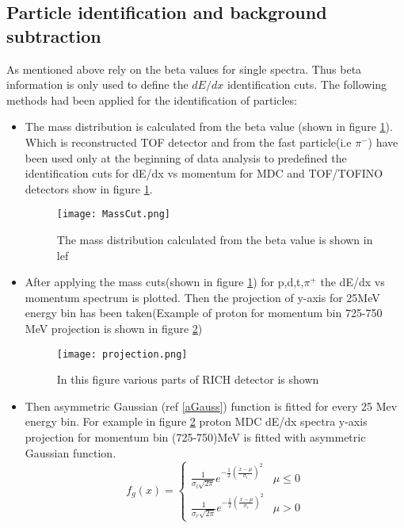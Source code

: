 \subsection{\label{PID} Particle identification and background subtraction}
As mentioned above rely on the beta values for single spectra. Thus beta information is only used to define the $dE/dx$ identification cuts. The following methods had been applied for the identification of particles:
\begin{itemize}
	\item The mass distribution is calculated from the beta value (shown in figure \ref{MassCuts}). Which is  reconstructed TOF detector and from the fast particle(i.e $\pi^{-}$) have been used only at the beginning of data analysis to predefined the identification cuts for dE/dx vs momentum for MDC and TOF/TOFINO detectors show in figure \ref{MassCuts}.
	\begin{figure}
		\centering
		\texttt{[image: MassCut.png]}
		\caption{The mass distribution calculated from the beta value is shown in lef}
		\label{MassCuts}
	\end{figure}
	\item After applying the mass cuts(shown in figure \ref{MassCuts}) for p,d,t,$\pi^+$ the dE/dx vs momentum spectrum is plotted. Then the projection of y-axis for 25MeV energy bin has been taken(Example of proton for momentum bin 725-750 MeV projection is shown in figure \ref{Projec})
	\begin{figure}
		\centering
		\texttt{[image: projection.png]}
		\caption{In this figure various parts of RICH detector is shown }
		\label{Projec}
	\end{figure}
   \item Then asymmetric Gaussian (ref \ref{aGauss}) function is fitted for every 25 Mev energy bin. For example in figure \ref{Projec} proton MDC dE/dx spectra y-axis projection for momentum bin (725-750)MeV is fitted with asymmetric Gaussian function.  
   \begin{equation}
   	f_g(x)=\begin{cases}
   		\frac{1}{\sigma_l\sqrt{2\pi}}e^{-\frac{1}{2}\left(\frac{x-\mu}{\sigma_l}\right)^2}&\mu\le0\\
   		\frac{1}{\sigma_r\sqrt{2\pi}}e^{-\frac{1}{2}\left(\frac{x-\mu}{\sigma_r}\right)^2}&\mu>0
   	\end{cases}
   \label{aGauss}
   \end{equation}

\end{itemize}
